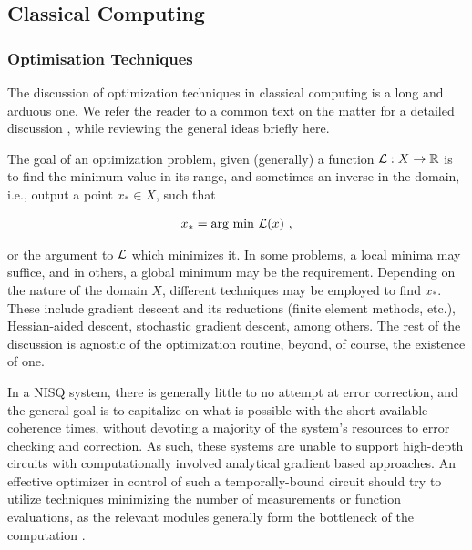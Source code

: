
\subsection{Classical Computing}

\subsubsection{Optimisation Techniques}
The discussion of optimization techniques in classical computing is a long and
arduous one. We refer the reader to a common text on the matter for a detailed
discussion \cite{boyd2004convex,nocedal2006numerical}, while reviewing the
general ideas briefly here.

The goal of an optimization problem, given (generally) a function
\(\mathcal{L}:X\to\mathbb{R}\) is to find the minimum value in its range, and sometimes an
inverse in the domain, i.e., output a point \(x_* \in X\), such that

\begin{gather*}
    x_* = \text{arg min } \mathcal{L}(x)~,
\end{gather*}

or the argument to \(\mathcal{L}\) which minimizes it. In some problems, a local
minima may suffice, and in others, a global minimum may be the requirement.
Depending on the nature of the domain \(X\), different techniques may be
employed to find \(x_*\). These include gradient descent and its reductions
(finite element methods, etc.), Hessian-aided descent,  stochastic gradient
descent, among others. The rest of the discussion is agnostic of the
optimization routine, beyond, of course, the existence of one.

In a NISQ system, there is generally little to no attempt at error correction,
and the general goal is to capitalize on what is possible with the short
available coherence times, without devoting a majority of the system's resources
to error checking and correction. As such, these systems are unable to support
high-depth circuits with computationally involved analytical gradient based
approaches. An effective optimizer in control of such a temporally-bound circuit
should try to utilize techniques minimizing the number of measurements or
function evaluations, as the relevant modules generally form the bottleneck of
the computation \cite[see][chapter II.D]{bharti2021noisy}.

